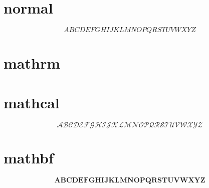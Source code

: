 \documentclass{article}
\newcommand\cA{{\mathcal A}}
\newcommand\cB{{\mathcal B}}
\newcommand\cC{{\mathcal C}}
\newcommand\cD{{\mathcal D}}
\newcommand\cE{{\mathcal E}}
\newcommand\cF{{\mathcal F}}
\newcommand\cG{{\mathcal G}}
\newcommand\cH{{\mathcal H}}
\newcommand\cI{{\mathcal I}}
\newcommand\cJ{{\mathcal J}}
\newcommand\cK{{\mathcal K}}
\newcommand\cL{{\mathcal L}}
\newcommand\cM{{\mathcal M}}
\newcommand\cN{{\mathcal N}}
\newcommand\cO{{\mathcal O}}
\newcommand\cP{{\mathcal P}}
\newcommand\cQ{{\mathcal Q}}
\newcommand\cR{{\mathcal R}}
\newcommand\cS{{\mathcal S}}
\newcommand\cT{{\mathcal T}}
\newcommand\cU{{\mathcal U}}
\newcommand\cV{{\mathcal V}}
\newcommand\cW{{\mathcal W}}
\newcommand\cX{{\mathcal X}}
\newcommand\cY{{\mathcal Y}}
\newcommand\cZ{{\mathcal Z}}
\newcommand\bA{{\mathbf A}}
\newcommand\bB{{\mathbf B}}
\newcommand\bC{{\mathbf C}}
\newcommand\bD{{\mathbf D}}
\newcommand\bE{{\mathbf E}}
\newcommand\bF{{\mathbf F}}
\newcommand\bG{{\mathbf G}}
\newcommand\bH{{\mathbf H}}
\newcommand\bI{{\mathbf I}}
\newcommand\bJ{{\mathbf J}}
\newcommand\bK{{\mathbf K}}
\newcommand\bL{{\mathbf L}}
\newcommand\bM{{\mathbf M}}
\newcommand\bN{{\mathbf N}}
\newcommand\bO{{\mathbf O}}
\newcommand\bP{{\mathbf P}}
\newcommand\bQ{{\mathbf Q}}
\newcommand\bR{{\mathbf R}}
\newcommand\bS{{\mathbf S}}
\newcommand\bT{{\mathbf T}}
\newcommand\bU{{\mathbf U}}
\newcommand\bV{{\mathbf V}}
\newcommand\bW{{\mathbf W}}
\newcommand\bX{{\mathbf X}}
\newcommand\bY{{\mathbf Y}}
\newcommand\bZ{{\mathbf Z}}
\begin{document}
    \section{normal}
    $$
    ABCDEFGHIJKLMNOPQRSTUVWXYZ
    $$
    \section{mathrm}
    
    \section{mathcal}
    $$
    \cA\cB\cC\cD\cE\cF\cG\cH\cI\cJ\cK\cL\cM\cN\cO\cP\cQ\cR\cS\cT\cU\cV\cW\cX\cY\cZ
    $$
    \section{mathbf}
    $$
    \bA\bB\bC\bD\bE\bF\bG\bH\bI\bJ\bK\bL\bM\bN\bO\bP\bQ\bR\bS\bT\bU\bV\bW\bX\bY\bZ
    $$
\end{document}
